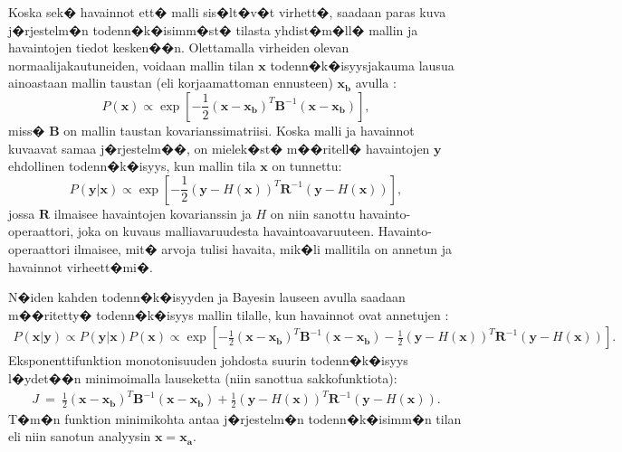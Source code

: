 \documentclass[12pt,a4paper,finnish,margin=2in]{article}
\begin{document}
Koska sek� havainnot ett� malli sis�lt�v�t virhett�, saadaan paras kuva j�rjestelm�n todenn�k�isimm�st� tilasta yhdist�m�ll� mallin ja havaintojen tiedot kesken��n. Olettamalla virheiden olevan normaalijakautuneiden, voidaan mallin tilan $\mathbf{x}$ todenn�k�isyysjakauma lausua ainoastaan mallin taustan (eli korjaamattoman ennusteen) $\mathbf{x_b}$ avulla \citep{nichols_2010}:
\begin{equation} \label{model_prob_eq}
P(\mathbf{x}) \propto \exp\left [ -\frac{1}{2}(\mathbf{x}-\mathbf{x_b})^T \mathbf{B}^{-1} (\mathbf{x}-\mathbf{x_b})\right ],
\end{equation}
miss� $\mathbf{B}$ on mallin taustan kovarianssimatriisi. Koska malli ja havainnot kuvaavat samaa j�rjestelm��, on mielek�st� m��ritell� havaintojen $\mathbf{y}$ ehdollinen todenn�k�isyys, kun mallin tila $\mathbf{x}$ on tunnettu:
\begin{equation} \label{data_prob_eq}
P(\mathbf{y} | \mathbf{x}) \propto \exp\left [ -\frac{1}{2}(\mathbf{y}-H(\mathbf{x}))^T \mathbf{R}^{-1} (\mathbf{y}-H(\mathbf{x}))\right ],
\end{equation}
jossa $\mathbf{R}$ ilmaisee havaintojen kovarianssin ja $H$ on niin sanottu havainto-operaattori, joka on kuvaus malliavaruudesta havaintoavaruuteen. Havainto-operaattori ilmaisee, mit� arvoja tulisi havaita, mik�li mallitila on annetun ja havainnot virheett�mi�.

N�iden kahden todenn�k�isyyden ja Bayesin lauseen avulla saadaan m��ritetty� todenn�k�isyys mallin tilalle, kun havainnot ovat annetujen \citep{nichols_2010}:
\begin{align} \label{final_prob_eq}
P(\mathbf{x} | \mathbf{y}) \propto P(\mathbf{y} | \mathbf{x}) P(\mathbf{x}) \propto 
\exp\left [ -\frac{1}{2}(\mathbf{x}-\mathbf{x_b})^T \mathbf{B}^{-1} (\mathbf{x}-\mathbf{x_b}) -\frac{1}{2}(\mathbf{y}-H(\mathbf{x}))^T \mathbf{R}^{-1} (\mathbf{y}-H(\mathbf{x}))\right ].
\end{align}
Eksponenttifunktion monotonisuuden johdosta suurin todenn�k�isyys l�ydet��n minimoimalla lauseketta (niin sanottua sakkofunktiota):
\begin{align} \label{J_eq}
 J~=~\frac{1}{2}(\mathbf{x}-\mathbf{x_b})^T \mathbf{B}^{-1} (\mathbf{x}-\mathbf{x_b}) + \frac{1}{2}(\mathbf{y}-H(\mathbf{x}))^T \mathbf{R}^{-1} (\mathbf{y}-H(\mathbf{x})).
\end{align}
T�m�n funktion minimikohta antaa j�rjestelm�n todenn�k�isimm�n tilan eli niin sanotun analyysin $\mathbf{x}=\mathbf{x_a}$.
\end{document}
